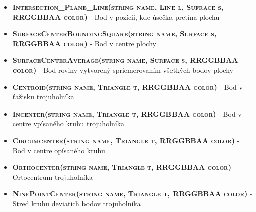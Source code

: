 \begin{itemize}
\item \textsc{\textbf{Intersection\_Plane\_Line(string name, Line l, Sufrace s, RRGGBBAA color)}} - Bod v pozícii, kde úsečka pretína plochu %


\item \textsc{\textbf{SurfaceCenterBoundingSquare(string name, Surface s, RRGGBBAA color)}} - Bod v centre plochy %

\item \textsc{\textbf{SurfaceCenterAverage(string name, Surface s, RRGGBBAA color) }} - Bod roviny vytvorený spriemerovaním všetkých bodov plochy%

\item \textsc{\textbf{Centroid(string name, Triangle t, RRGGBBAA color)}} - Bod v ťažisku trojuholníka %

\item \textsc{\textbf{Incenter(string name, Triangle t, RRGGBBAA color)}} - Bod v centre vpísaného kruhu trojuholníka%

\item \textsc{\textbf{Circumcenter(string name, Triangle t, RRGGBBAA color) }} - Bod v centre opísaného kruhu %

\item \textsc{\textbf{Orthocenter(string name, Triangle t, RRGGBBAA color)}} - Ortocentrum trojuholníka %

\item \textsc{\textbf{NinePointCenter(string name, Triangle t, RRGGBBAA color)}} - Stred kruhu deviatich bodov trojuholníka %


\end{itemize}
